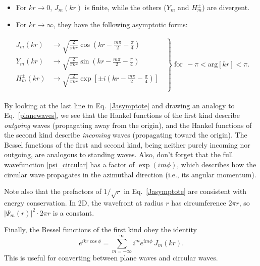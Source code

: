 \documentclass[pra,12pt]{revtex4}
\begin{document}
\begin{itemize}
\item For $kr \rightarrow 0$, $J_m(kr)$ is finite, while the others ($Y_m$ and
$H_m^\pm$) are divergent.

\item For $kr \rightarrow \infty$, they have the following asymptotic forms:
\end{itemize}
\vskip -0.26in
\begin{align}
  \left.
  \begin{aligned}
    J_m(kr) &\rightarrow
    \sqrt{\frac{2}{\pi kr}} \cos\!\left(kr - \frac{m\pi}{2} - \frac{\pi}{4}\right) \\
    Y_m(kr) &\rightarrow
    \sqrt{\frac{2}{\pi kr}} \sin\!\left(kr - \frac{m\pi}{2} - \frac{\pi}{4}\right) \\
    H_m^\pm(kr) &\rightarrow
    \sqrt{\frac{2}{\pi kr}}
    \exp\left[\pm i\left(kr - \frac{m\pi}{2} - \frac{\pi}{4}\right)\right] \\
  \end{aligned}\;\;
  \right\}
  \; \text{for}\;\, -\pi < \mathrm{arg}[kr] < \pi.
  \label{Jasymptote}
\end{align}

By looking at the last line in Eq.~\eqref{Jasymptote} and drawing an
analogy to Eq.~\eqref{planewaves}, we see that the Hankel functions of
the first kind describe \textit{outgoing} waves (propagating away from
the origin), and the Hankel functions of the second kind describe
\textit{incoming} waves (propagating toward the origin).  The Bessel
functions of the first and second kind, being neither purely incoming
nor outgoing, are analogous to standing waves.  Also, don't forget
that the full wavefunction \eqref{psi_circular} has a factor of
$\exp(im\phi)$, which describes how the circular wave propagates in
the azimuthal direction (i.e., its angular momentum).

Note also that the prefactors of $1/\sqrt{r}$ in
Eq.~\eqref{Jasymptote} are consistent with energy conservation.  In
2D, the wavefront at radius $r$ has circumference $2\pi r$, so
$|\Psi_m(r)|^2 \cdot 2\pi r$ is a constant.

Finally, the Bessel functions of the first kind obey the identity
\begin{equation}
  e^{ikr\cos\phi} = \sum_{m=-\infty}^\infty i^m e^{im\phi} \, J_m(kr).
  \label{eikrcosphi}
\end{equation}
This is useful for converting between plane waves and circular waves.
\end{document}
